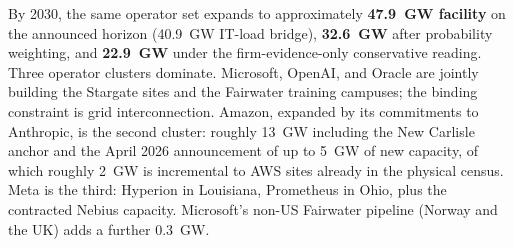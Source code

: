 \documentclass[11pt,a4paper]{article}
\begin{document}
By 2030, the same operator set expands to approximately \textbf{47.9~GW facility} on the announced horizon (40.9~GW IT-load bridge), \textbf{32.6~GW} after probability weighting, and \textbf{22.9~GW} under the firm-evidence-only conservative reading. Three operator clusters dominate. Microsoft, OpenAI, and Oracle are jointly building the Stargate sites and the Fairwater training campuses; the binding constraint is grid interconnection. Amazon, expanded by its commitments to Anthropic, is the second cluster: roughly 13~GW including the New Carlisle anchor and the April 2026 announcement of up to 5~GW of new capacity, of which roughly 2~GW is incremental to AWS sites already in the physical census. Meta is the third: Hyperion in Louisiana, Prometheus in Ohio, plus the contracted Nebius capacity. Microsoft's non-US Fairwater pipeline (Norway and the UK) adds a further 0.3~GW.
\end{document}

